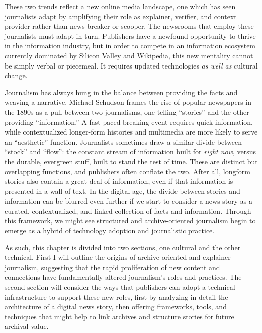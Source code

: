 These two trends reflect a new online media landscape, one which has seen journalists adapt by amplifying their role as explainer, verifier, and context provider rather than news breaker or scooper. The newsrooms that employ these journalists must adapt in turn. Publishers have a newfound opportunity to thrive in the information industry, but in order to compete in an information ecosystem currently dominated by Silicon Valley and Wikipedia, this new mentality cannot be simply verbal or piecemeal. It requires updated technologies \emph{as well as} cultural change.

Journalism has always hung in the balance between providing the facts and weaving a narrative. Michael Schudson frames the rise of popular newspapers in the 1890s as a pull between two journalisms, one telling ``stories'' and the other providing ``information.'' A fast-paced breaking event requires quick information, while contextualized longer-form histories and multimedia are more likely to serve an ``aesthetic'' function.\autocite[89]{schudson_discovering_1978} Journalists sometimes draw a similar divide between ``stock'' and ``flow'': the constant stream of information built for \emph{right now}, versus the durable, evergreen stuff, built to stand the test of time.\autocite{sloan_stock_2010} These are distinct but overlapping functions, and publishers often conflate the two. After all, longform stories also contain a great deal of information, even if that information is presented in a wall of text. In the digital age, the divide between stories and information can be blurred even further if we start to consider a news story as a curated, contextualized, and linked collection of facts and information. Through this framework, we might see structured and archive-oriented journalism begin to emerge as a hybrid of technology adoption and journalistic practice.

As such, this chapter is divided into two sections, one cultural and the other technical. First I will outline the origins of archive-oriented and explainer journalism, suggesting that the rapid proliferation of new content and connections have fundamentally altered journalism's roles and practices. The second section will consider the ways that publishers can adopt a technical infrastructure to support these new roles, first by analyzing in detail the architecture of a digital news story, then offering frameworks, tools, and techniques that might help to link archives and structure stories for future archival value.

